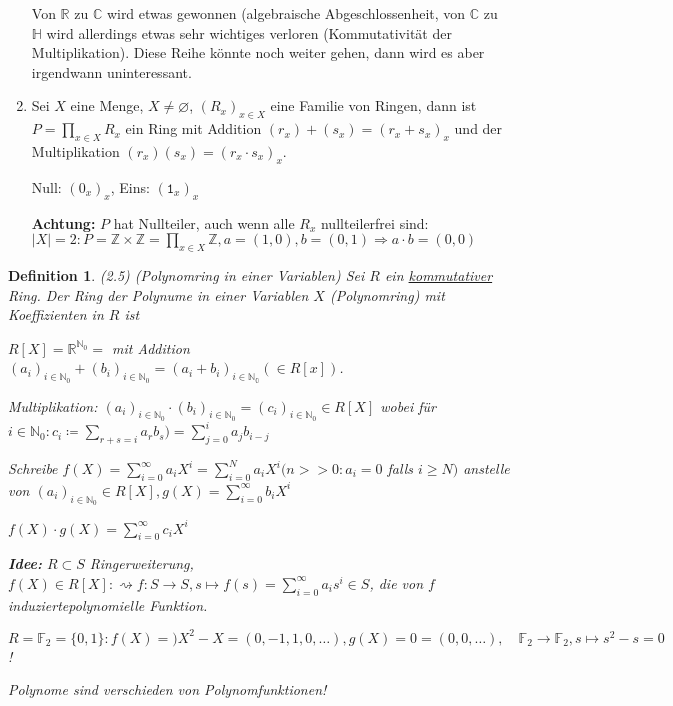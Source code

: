 \documentclass[10pt,a4paper]{article}
\newtheorem{defi}{Definition}
\begin{document}
\begin{enumerate}
Von $\mathbb{R}$ zu $\mathbb{C}$ wird etwas gewonnen (algebraische Abgeschlossenheit, von $\mathbb{C}$ zu $\mathbb{H}$ wird allerdings etwas sehr wichtiges verloren (Kommutativität der Multiplikation). Diese Reihe könnte noch weiter gehen, dann wird es aber irgendwann uninteressant.

\item Sei $X$ eine Menge, $X \neq \varnothing$, $(R_x)_{x \in X}$ eine Familie von Ringen, dann ist $P = \prod_{x \in X} R_x$ ein Ring mit Addition $(r_x) + (s_x) = (r_x + s_x)_x$ und der Multiplikation $(r_x)(s_x) = (r_x \cdot s_x)_x$. 

Null: $(0_x)_x$, Eins: $(\texttt{1}_x)_x$

\textbf{Achtung:} $P$ hat Nullteiler, auch wenn alle $R_x$ nullteilerfrei sind: $\vert X \vert = 2: P = \mathbb{Z} \times \mathbb{Z} = \prod_{x \in X} \mathbb{Z}, a = (1,0), b = (0,1) \Rightarrow a \cdot b = (0,0)$
\end{enumerate}

\begin{defi}(2.5) (Polynomring in einer Variablen)
Sei $R$ ein \underline{kommutativer} Ring. Der \emph{Ring der Polynume in einer Variablen $X$} (Polynomring) mit \emph{Koeffizienten in $R$} ist

$R[X] = \mathbb{R}^{\mathbb{N}_0} =$  mit Addition $(a_i)_{i \in \mathbb{N}_0} + (b_i)_{i \in \mathbb{N}_0} = (a_i + b_i)_{i \in \mathbb{N_0}} (\in R[x])$.

Multiplikation: $(a_i)_{i \in \mathbb{N}_0} \cdot (b_i)_{i \in \mathbb{N}_0} = (c_i)_{i \in \mathbb{N}_0} \in R[X]$ wobei für $i \in \mathbb{N}_0: c_i \coloneqq \sum_{r+s = i} a_r b_s ) = \sum_{j=0}^{i} a_j b_{i-j}$

Schreibe $f(X) = \sum_{i=0}^{\infty} a_i X^i = \sum_{i = 0}^{N} a_i X^i (n >> 0: a_i = 0$ falls $i \geq N)$ anstelle von $(a_i)_{i \in \mathbb{N}_0} \in R[X], g(X) = \sum_{i=0}^{\infty} b_i X^i$

$f(X) \cdot g(X) = \sum_{i = 0}^{\infty} c_i X^i$

\textbf{Idee:} $R \subset S$ Ringerweiterung, $f(X) \in R[X] : \rightsquigarrow f: S \to S, s \mapsto f(s) = \sum_{i=0}^{\infty} a_i s^i \in S$, die von $f$ induzierte\glqq polynomielle Funktion\grqq .

$R = \mathbb{F}_2 = \{0,1\} : f(X) =) X^2 - X = (0, -1, 1, 0, \dots), g(X) = 0 = (0,0, \dots), \quad \mathbb{F}_2 \to \mathbb{F}_2, s \mapsto s^2 - s = 0$ !

Polynome sind verschieden von Polynomfunktionen!
\end{defi}
\end{document}
